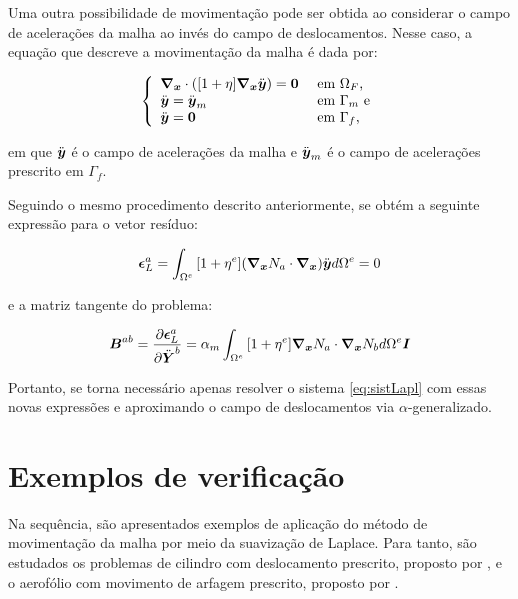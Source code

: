 Uma outra possibilidade de movimentação pode ser obtida ao considerar o campo de acelerações da malha ao invés do campo de deslocamentos. Nesse caso, a equação que descreve a movimentação da malha é dada por:

\begin{equation}
    \left\{
    \begin{array}{ll}
        \boldsymbol{\nabla_x}\cdot([1+\eta]\boldsymbol{\nabla_x}\ddot{\boldsymbol{y}})=\boldsymbol{0} & \text{ em }\Omega_F\text{,}  \\
        \ddot{\boldsymbol{y}}=\ddot{\boldsymbol{y}}_m                  & \text{ em }\Gamma_m\text{ e} \\
        \ddot{\boldsymbol{y}}=\boldsymbol{0}                      & \text{ em }\Gamma_f\text{,}
    \end{array}
    \right.
    \label{eq:LaplMovAcc}
\end{equation}

\noindent em que $\ddot{\boldsymbol{y}}$ é o campo de acelerações da malha e $\ddot{\boldsymbol{y}}_m$ é o campo de acelerações prescrito em $\Gamma_f$.

Seguindo o mesmo procedimento descrito anteriormente, se obtém a seguinte expressão para o vetor resíduo:

\begin{equation}
    \boldsymbol{\epsilon}_L^a=\int_{\Omega^e}{[1+\eta^e](\boldsymbol{\nabla_x} N_a\cdot\boldsymbol{\nabla_x})\ddot{\boldsymbol{y}} d\Omega^e}=0
    \label{eq:resLaplAcc}
\end{equation}

\noindent e a matriz tangente do problema:

\begin{equation}
    \boldsymbol{B}^{ab}=\frac{\partial{\boldsymbol{\epsilon}_L^a}}{\partial{\ddot{\boldsymbol{Y}}^b}}=\alpha_m\int_{\Omega^e}{[1+\eta^e]\boldsymbol{\nabla_x} N_a\cdot\boldsymbol{\nabla_x} N_b d\Omega^e}\boldsymbol{I}
    \label{eq:movMatrizAcc}
\end{equation}

Portanto, se torna necessário apenas resolver o sistema \ref{eq:sistLapl} com essas novas expressões e aproximando o campo de deslocamentos via $\alpha$-generalizado.

\section{Exemplos de verificação}

Na sequência, são apresentados exemplos de aplicação do método de movimentação da malha por meio da suavização de Laplace. Para tanto, são estudados os problemas de cilindro com deslocamento prescrito, proposto por , e o aerofólio com movimento de arfagem prescrito, proposto por .

